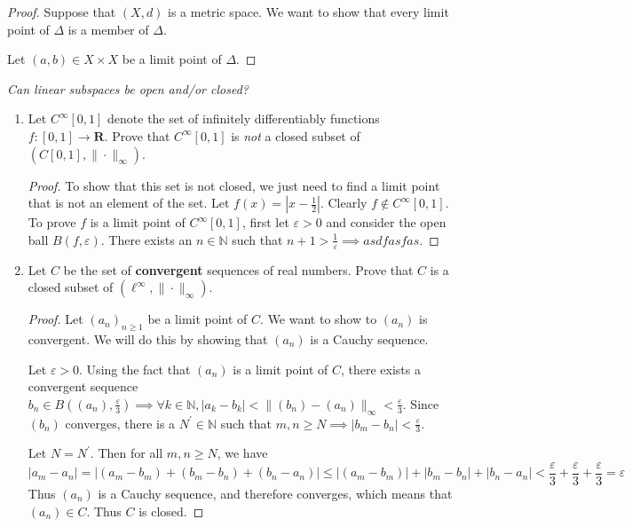 \documentclass{article}
\newcommand{\R}{\mathbf{R}}
\theoremstyle{plain} %
\numberwithin{thm}{section} %
\theoremstyle{definition}
\begin{document}
        \begin{proof}
            Suppose that \((X,d)\) is a metric space. We want to show that every limit point of \(\Delta\) is a member of \(\Delta\).

            Let \((a,b) \in X\times X\) be a limit point of \(\Delta\).
        \end{proof}

    \exercise\textit{Can linear subspaces be open and/or closed?}

    \begin{enumerate}[label=(\alph*)]
        \item Let $C^\infty[0,1]$ denote the set of infinitely differentiably functions $f:[0,1]\rightarrow \R$. Prove that $C^\infty[0,1]$ is \textit{not} a closed subset of $(C[0,1],\|\cdot\|_\infty)$.

        \begin{proof}
            To show that this set is not closed, we just need to find a limit point that is not an element of the set. Let \(f(x) = |x-\frac{1}{2}|\). Clearly \(f \notin C^{\infty} [0,1]\). To prove \(f\) is a limit point of \(C^{\infty} [0,1]\), first let \(\varepsilon > 0\) and consider the open ball \(B(f, \varepsilon)\). There exists an \(n \in \mathbb{N}\) such that \(n + 1 > \frac{1}{\varepsilon} \implies asdfasfas\). 
            
        \end{proof}

        \item Let $C$ be the set of \textbf{convergent} sequences of real numbers. Prove that $C$ is a closed subset of $(\ell^\infty,\|\cdot\|_\infty)$.

        \begin{proof}
            Let \((a_n)_{n\geq1}\) be a limit point of \(C\). We want to show to \((a_n)\) is convergent. We will do this by showing that \((a_n)\) is a Cauchy sequence.

            Let \(\varepsilon > 0\). Using the fact that \((a_n)\) is a limit point of \(C\), there exists a convergent sequence \(b_n \in B((a_n), \frac{\varepsilon}{3}) \implies \forall k \in \mathbb{N}, |a_k - b_k| < \|(b_n) - (a_n)\| _\infty < \frac{\varepsilon}{3}\). Since \((b_n)\) converges, there is a \(N^\prime \in \mathbb{N}\) such that \(m,n \geq N \implies |b_m - b_n| < \frac{\varepsilon}{3}\).
            
            Let \(N = N^\prime\). Then for all \(m,n \geq N\), we have
            \[
                |a_m - a_n| = |(a_m - b_m) + (b_m - b_n) + (b_n - a_n)| \leq |(a_m - b_m)| + |b_m - b_n| + |b_n - a_n| < \frac{\varepsilon}{3} + \frac{\varepsilon}{3} + \frac{\varepsilon}{3} = \varepsilon
            \]
            Thus \((a_n)\) is a Cauchy sequence, and therefore converges, which means that \((a_n) \in C\). Thus \(C\) is closed.


\end{proof}
\end{enumerate}
\end{document}
